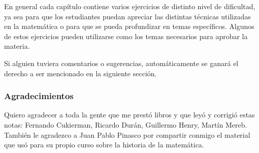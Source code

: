 En general cada capítulo contiene varios ejercicios de distinto nivel de
dificultad, ya sea para que los estudiantes puedan apreciar las distintas
técnicas utilizadas en la matemática o para que se pueda profundizar en temas
específicos. Algunos de estos ejercicios pueden utilizarse como los temas
necesarios para aprobar la materia. 

Si alguien tuviera comentarios o sugerencias, automáticamente se ganará el
derecho a ser mencionado en la siguiente sección.

\subsubsection*{Agradecimientos}

Quiero agradecer a toda la gente que me prestó libros y que leyó y corrigió
estas notas: Fernando Cukierman, Ricardo Durán, Guillermo Henry, Martín Mereb. También le agradezco a Juan Pablo
Pinasco por compartir conmigo el material que usó para su propio curso sobre la
historia de la matemática. 

